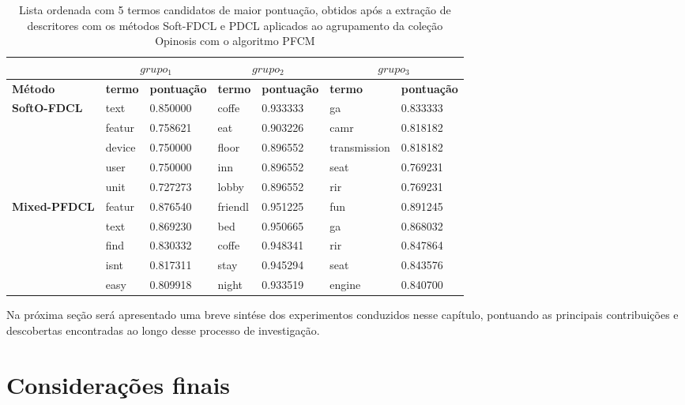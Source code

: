 \begin{table}[!h]
  \centering
  \begin{tabular}{ | l | l l | l l | l l |}
    \hline
    & \multicolumn{2}{c|}{$grupo_1$} & \multicolumn{2}{c|}{$grupo_2$} &
    \multicolumn{2}{c|}{$grupo_3$} \\
    \hline
    {\bf Método} & {\bf termo} & {\bf pontuação} & {\bf termo} & {\bf pontuação} & {\bf termo} &
    {\bf pontuação} \\
    \hline
 \multirow{5}{*}{{\bf SoftO-FDCL}} & text   & 0.850000 & coffe  &  0.933333 &  ga     & 0.833333 \\
                                    & featur & 0.758621 & eat   &  0.903226 &  camr   & 0.818182 \\
                                    & device  & 0.750000 & floor   &  0.896552 &  transmission & 0.818182 \\
                                    & user   & 0.750000 & inn   &  0.896552 &  seat   & 0.769231 \\
                                    & unit   & 0.727273 & lobby  &  0.896552 &  rir    & 0.769231 \\
    \hline
 \multirow{5}{*}{{\bf Mixed-PFDCL}} & featur & 0.876540 & friendl & 0.951225 & fun & 0.891245  \\
&  text          &  0.869230  &  bed           &  0.950665  &  ga            &  0.868032  \\
&  find          &  0.830332  &  coffe          &  0.948341  &  rir           &  0.847864  \\
&  isnt           &  0.817311  &  stay           &  0.945294  &  seat          &  0.843576  \\
&  easy           &  0.809918  &  night         &  0.933519  &  engine         &  0.840700  \\
    \hline
  \end{tabular}
  \caption{Lista ordenada com 5 termos candidatos de maior pontuação, obtidos após a extração de
  descritores com os métodos Soft-FDCL e PDCL aplicados ao agrupamento da coleção Opinosis com o
algoritmo PFCM}
  \label{table:rankingmixedpdcl}
\end{table}

Na próxima seção será apresentado uma breve sintése dos experimentos conduzidos nesse capítulo,
pontuando as principais contribuições e descobertas encontradas ao longo desse processo de
investigação.

\section{Considerações finais}

